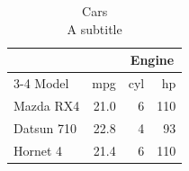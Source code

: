 \begin{table}[t]
\caption*{
{\fontsize{20}{25}\selectfont  Cars\fontsize{12}{15}\selectfont } \\ 
{\fontsize{14}{17}\selectfont  A subtitle\fontsize{12}{15}\selectfont }
} 
\fontsize{12.0pt}{14.0pt}\selectfont
\begin{tabular*}{\linewidth}{@{\extracolsep{\fill}}lrrr}
\toprule
 &  & \multicolumn{2}{c}{{Engine}} \\ 
\cmidrule(lr){3-4}
Model & mpg & cyl & hp \\ 
\midrule\addlinespace[2.5pt]
Mazda RX4 & 21.0 & 6 & 110 \\ 
Datsun 710 & 22.8 & 4 & 93 \\ 
Hornet 4 & 21.4 & 6 & 110 \\ 
\bottomrule
\end{tabular*}
\end{table}

